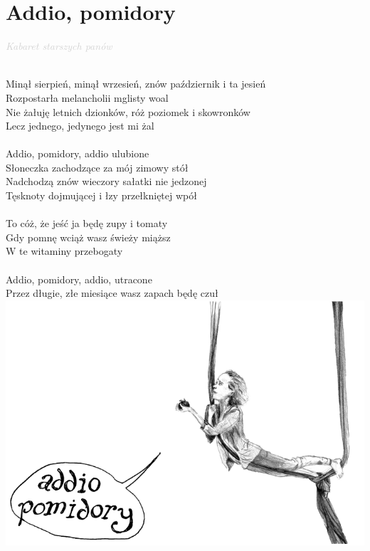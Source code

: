 \documentclass[a5paper, 10pt]{book}
\begin{document}
\section{Addio, pomidory}\textcolor{lightgray}{\textit{Kabaret starszych panów}}\\~\\
\begin{minipage}[t]{0.8\textwidth}
  Minął sierpień, minął wrzesień, znów październik i ta jesień\\
  Rozpostarła melancholii mglisty woal			\\
  Nie żałuję letnich dzionków, róż poziomek i skowronków\\
  Lecz jednego, jedynego jest mi żal				\\
  \\
  \hspace*{5mm}Addio, pomidory, addio ulubione				\\
  \hspace*{5mm}Słoneczka zachodzące za mój zimowy stół		\\
  \hspace*{5mm}Nadchodzą znów wieczory sałatki nie jedzonej\\
  \hspace*{5mm}Tęsknoty dojmującej i łzy przełkniętej wpół\\
  \\
  \hspace*{5mm}To cóż, że jeść ja będę zupy i tomaty		\\
  \hspace*{5mm}Gdy pomnę wciąż wasz świeży miąższ			\\
  \hspace*{5mm}W te witaminy przebogaty\\
  \\
  \hspace*{5mm}Addio, pomidory, addio, utracone\\
  \hspace*{5mm}Przez długie, złe miesiące wasz zapach będę czuł\\
  \hspace*{0.35\textwidth}\includegraphics[height=0.6\textwidth]{images/addio_pomidory.png}\vspace*{-0.6\textwidth}

\end{minipage}
\end{document}
